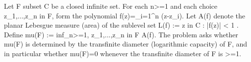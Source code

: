 Let F subset C be a closed infinite set. For each n>=1 and each choice z_1,...,z_n in F, form the polynomial f(z)=\prod_{i=1}^n (z-z_i).
Let A(f) denote the planar Lebesgue measure (area) of the sublevel set
  L(f) := { z in C : |f(z)| < 1 }.
Define
  mu(F) := inf_{n>=1, z_1,...,z_n in F} A(f).
The problem asks whether mu(F) is determined by the transfinite diameter (logarithmic capacity) of F, and in particular whether mu(F)=0 whenever the transfinite diameter of F is >=1.
